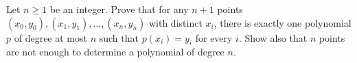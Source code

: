 Let $n\ge1$ be an integer. Prove that for any $n+1$ points $(x_0,y_0),(x_1,y_1),\dots,(x_n,y_n)$ with distinct $x_i$, there is exactly one polynomial $p$ of degree at most $n$ such that $p(x_i)=y_i$ for every $i$. Show also that $n$ points are not enough to determine a polynomial of degree $n$.
